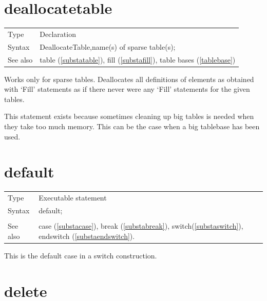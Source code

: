  
\section{deallocatetable}
\label{substadeallocatetable}

\noindent \begin{tabular}{ll}
Type & Declaration\\
Syntax & DeallocateTable,name(s) of sparse table(s);
\\ See also & table (\ref{substatable}), fill (\ref{substafill}),
   table bases (\ref{tablebase})
\end{tabular} \vspace{4mm}

\noindent Works only for sparse 
tables. Deallocates all definitions of elements as 
obtained with `Fill' statements as if there never were any 
`Fill' statements for the given tables.

This statement exists because sometimes cleaning up big tables is needed 
when they take too much memory. This can be the case when a big tablebase 
has been used. \vspace{10mm}

%
\section{default}
\label{substadefault}

\noindent \begin{tabular}{ll}
Type & Executable statement\\
Syntax & default; \\
\\ See also & case (\ref{substacase}), break (\ref{substabreak}),
		 switch(\ref{substaswitch}), endswitch (\ref{substaendswitch}).
\end{tabular} \vspace{4mm}

\noindent This is the default case in a switch construction.

\vspace{10mm}
%

\section{delete}
\label{substadelete}

